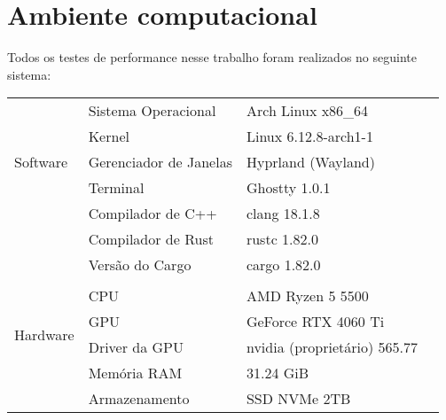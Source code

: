 \chapter{Ambiente computacional}

Todos os testes de performance nesse trabalho foram realizados no seguinte sistema:

\begin{table}[!ht]
	\centering
	\begin{tabular}{llll}
		\toprule
		\multirow{5}{3cm}{Software}
		 & Sistema Operacional    & Arch Linux x86\_64           & \\
		 & Kernel                 & Linux 6.12.8-arch1-1         & \\
		 & Gerenciador de Janelas & Hyprland (Wayland)           & \\
		 & Terminal               & Ghostty 1.0.1                & \\
		 & Compilador de C++      & clang 18.1.8                 & \\
		 & Compilador de Rust     & rustc 1.82.0                 & \\
		 & Versão do Cargo        & cargo 1.82.0                 & \\
		 &                        &                              & \\
		\multirow{4}{3cm}{Hardware}
		 & CPU                    & AMD Ryzen 5 5500             & \\
		 & GPU                    & GeForce RTX 4060 Ti          & \\
		 & Driver da GPU          & nvidia (proprietário) 565.77 & \\
		 & Memória RAM            & 31.24 GiB                    & \\
		 & Armazenamento          & SSD NVMe 2TB                 & \\
		\bottomrule
	\end{tabular}
\end{table}

\noindent
